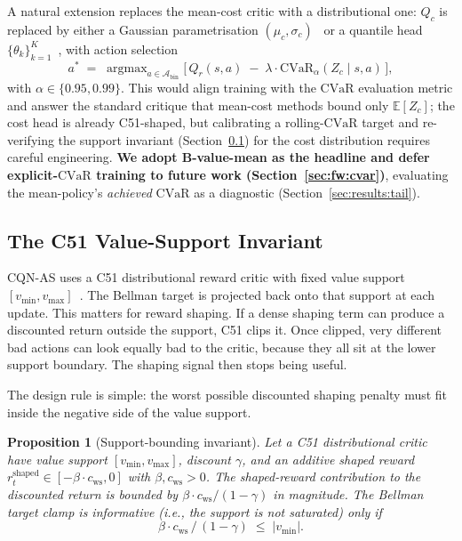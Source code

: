 \documentclass[11pt,a4paper]{report}
\newtheorem{proposition}[theorem]{Proposition}
\newcommand{\cvar}{\ensuremath{\mathrm{CVaR}}}
\newcommand{\cqnas}{CQN-AS}
\begin{document}
A natural extension replaces the mean-cost critic with a
distributional one: $Q_c$ is replaced by either a Gaussian
parametrisation $(\mu_c, \sigma_c)$~\cite{yang2021wcsac} or a
quantile head $\{\theta_k\}_{k=1}^K$~\cite{dabney2018qrdqn}, with
action selection
\begin{equation}
  a^* \;=\; \mathop{\mathrm{argmax}}_{a \in \mathcal{A}_{\mathrm{bin}}}
  \Big[\,Q_r(s,a) \;-\; \lambda \cdot \cvar_{\alpha}(Z_c \mid s, a)\,\Big],
\end{equation}
with $\alpha \in \{0.95, 0.99\}$. This would align training with the
\cvar{} evaluation metric and answer the standard critique that
mean-cost methods bound only $\mathbb{E}[Z_c]$; the cost head is
already C51-shaped, but calibrating a rolling-\cvar{} target and
re-verifying the support invariant
(Section~\ref{sec:method:lagrangian:support}) for the cost
distribution requires careful engineering. \textbf{We adopt
B-value-mean as the headline and defer explicit-\cvar{} training to
future work (Section~\ref{sec:fw:cvar})}, evaluating the
mean-policy's \emph{achieved} \cvar{} as a diagnostic
(Section~\ref{sec:results:tail}).

\subsection{The C51 Value-Support Invariant}
\label{sec:method:lagrangian:support}

\cqnas{} uses a C51 distributional reward critic with fixed value
support $[v_{\min}, v_{\max}]$~\cite{bellemare2017c51}. The Bellman
target is projected back onto that support at each update. This matters
for reward shaping. If a dense shaping term can produce a discounted
return outside the support, C51 clips it. Once clipped, very different
bad actions can look equally bad to the critic, because they all sit at
the lower support boundary. The shaping signal then stops being useful.

The design rule is simple: the worst possible discounted shaping
penalty must fit inside the negative side of the value support.

\begin{proposition}[Support-bounding invariant]
\label{lem:support-bound}
Let a C51 distributional critic have value support
$[v_{\min}, v_{\max}]$, discount $\gamma$, and an additive shaped
reward $r^{\mathrm{shaped}}_t \in [-\beta \cdot c_{\mathrm{ws}}, 0]$
with $\beta, c_{\mathrm{ws}} > 0$. The shaped-reward contribution
to the discounted return is bounded by
$\beta \cdot c_{\mathrm{ws}} / (1 - \gamma)$ in magnitude. The
Bellman target clamp is informative (i.e., the support is not
saturated) only if
\begin{equation}
  \beta \cdot c_{\mathrm{ws}} \,/\, (1-\gamma) \;\le\; |v_{\min}|.
  \label{eq:support-invariant}
\end{equation}
\end{proposition}
\end{document}
